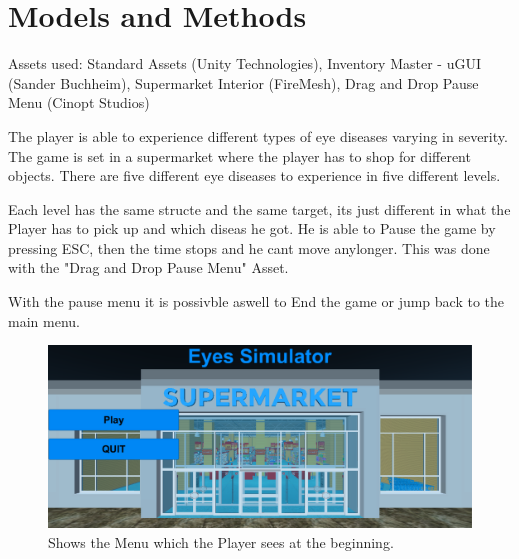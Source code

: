 \documentclass{acm_proc_article-sp}
\begin{document}
\section{Models and Methods}

Assets used: Standard Assets (Unity Technologies), Inventory Master - uGUI (Sander Buchheim), Supermarket Interior (FireMesh), Drag and Drop Pause Menu (Cinopt Studios)

The player is able to experience different types of eye diseases varying in severity. The game is set in a supermarket where the player has to shop for different objects. There are five different eye diseases to experience in five different levels.

Each level has the same structe and the same target, its just different in what the Player has to pick up and which diseas he got. He is able to Pause the game by pressing ESC, then the time stops and he cant move anylonger. This was done with the "Drag and Drop Pause Menu" Asset. 

With the pause menu it is possivble aswell to End the game or jump back to the main menu.

\begin{figure}
    \centering
    \includegraphics[width=\columnwidth]{Menu.png}
    \caption{Shows the Menu which the Player sees at the beginning.}
    \label{fig:menu}
\end{figure}
\end{document}
